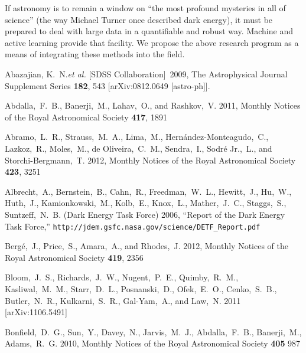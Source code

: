 \documentclass[prd, nofootinbib, floatfix, 12pt,tightenlines]{revtex4}
\begin{document}
If astronomy is to remain a window on ``the most profound mysteries in all of
science'' (the way Michael Turner once described dark energy), it must be
prepared to deal with large data in a quantifiable and robust way.  Machine and
active learning provide that facility.  We propose the above research program as
a means of integrating these methods into the field.

\newpage

\begin{thebibliography}{99}

  Abazajian, K.~N.{\it et al.}  [SDSS Collaboration]~2009,
  The Astrophysical Journal Supplement Series  {\bf 182}, 543
  [arXiv:0812.0649 [astro-ph]].

Abdalla,~F.~B., Banerji,~M., Lahav,~O., and Rashkov,~V. 2011,
Monthly Notices of the Royal Astronomical Society {\bf 417}, 1891

Abramo,~L.~R., Strauss,~M.~A., Lima,~M., Hern\'andez-Monteagudo,~C., Lazkoz,~R.,
Moles,~M., de Oliveira,~C.~M., Sendra,~I., Sodr\'e Jr.,~L., and
Storchi-Bergmann,~T. 2012, Monthly Notices of the Royal Astronomical Society
{\bf 423}, 3251

Albrecht,~A., Bernstein,~B., Cahn,~R., Freedman,~W.~L., Hewitt,~J.,
Hu,~W., Huth,~J., Kamionkowski,~M., Kolb,~E., Knox,~L., Mather,~J.~C.,
Staggs,~S., Suntzeff,~N.~B. (Dark Energy Task Force) 2006,
``Report of the Dark Energy Task Force,''
\verb|http://jdem.gsfc.nasa.gov/science/DETF_Report.pdf|


Berg\'e,~J., Price,~S., Amara,~A., and Rhodes,~J. 2012,
Monthly Notices of the Royal Astronomical Society {\bf 419}, 2356

Bloom,~J.~S., Richards,~J.~W., Nugent,~P.~E., Quimby,~R.~M., Kasliwal,~M.~M.,
Starr,~D.~L., Posnanski,~D., Ofek,~E.~O., Cenko,~S.~B., Butler,~N.~R.,
Kulkarni,~S.~R., Gal-Yam,~A., and Law,~N. 2011 [arXiv:1106.5491]

Bonfield,~D.~G., Sun,~Y., Davey,~N., Jarvis,~M.~J., Abdalla,~F.~B.,
Banerji,~M., Adams,~R.~G. 2010, Monthly Notices of the Royal Astronomical Society 
{\bf 405} 987


\end{thebibliography}
\end{document}
